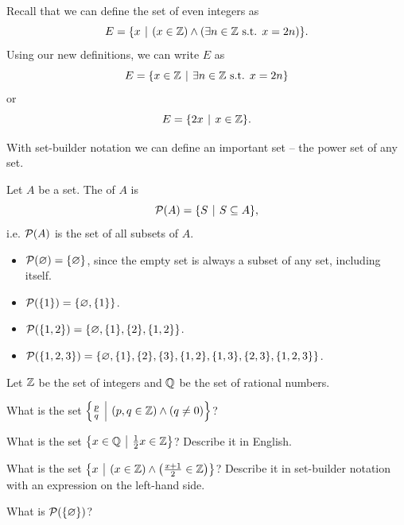 \begin{example}
    Recall that we can define the set of even integers as
    \[
        E = \{x \vert (x \in \Z) \land (\exists n \in \Z \text{ s.t. } x = 2n)\}.
    \]
    Using our new definitions, we can write $E$ as
    \[
        E = \{x \in \Z \vert \exists n \in \Z \text{ s.t. } x = 2n\}
    \]
    or
    \[
        E = \{2x \vert x \in \Z\}.
    \]
\end{example}

With set-builder notation we can define an important set -- the power set of any set.

\begin{definition}
    Let $A$ be a set. The  of $A$ is
    \[
        \Power{A} = \{S \vert S \subseteq A\},
    \]
    i.e. ${\mathcal{P}(A)}$ is the set of all subsets of $A$.
\end{definition}

\begin{example}
    \begin{itemize}[leftmargin=*]
        \item ${\mathcal{P}(\varnothing)} = \{\varnothing\}$, since the empty set is always a subset of any set, including itself.
        \item ${\mathcal{P}(\{1\})} = \{\varnothing, \{1\}\}$.
        \item ${\mathcal{P}(\{1, 2\})} = \{\varnothing, \{1\}, \{2\}, \{1, 2\}\}$.
        \item ${\mathcal{P}(\{1, 2, 3\})} = \{\varnothing, \{1\}, \{2\}, \{3\}, \{1, 2\}, \{1, 3\}, \{2, 3\}, \{1, 2, 3\}\}$.
    \end{itemize}
\end{example}

\begin{exercise}
    Let $\mathbb{Z}$ be the set of integers and $\mathbb{Q}$ be the set of rational numbers.
    \begin{partquestions}{\alph*}
        \item What is the set $\left\{\frac pq \vert (p, q \in \Z) \land (q \neq 0)\right\}$?
        \item What is the set $\left\{x \in \Q \vert \frac12 x \in \Z\right\}$? Describe it in English.
        \item What is the set $\left\{x \vert (x \in \Z) \land \left(\frac{x+1}{2} \in \Z\right)\right\}$? Describe it in set-builder notation with an expression on the left-hand side.
        \item What is ${\mathcal{P}(\{\varnothing\})}$?
    \end{partquestions}
\end{exercise}

